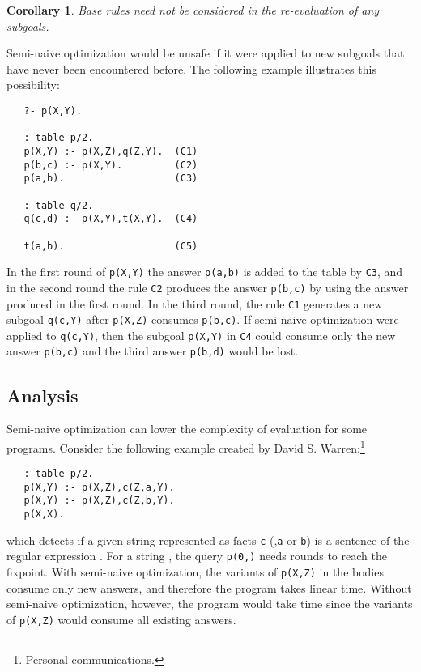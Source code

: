\documentclass{tlp}
\begin{document}
\newtheorem{corollary}{Corollary}
\begin{corollary}
Base rules need not be considered in the re-evaluation of any subgoals.
\end{corollary}

Semi-naive optimization would be unsafe if it were applied to new subgoals that have never been encountered before. The following example illustrates this possibility: 

\begin{verbatim}
   ?- p(X,Y).

   :-table p/2.
   p(X,Y) :- p(X,Z),q(Z,Y).  (C1)
   p(b,c) :- p(X,Y).         (C2)
   p(a,b).                   (C3)

   :-table q/2.
   q(c,d) :- p(X,Y),t(X,Y).  (C4)

   t(a,b).                   (C5)
\end{verbatim}

\noindent
In the first round of {\tt p(X,Y)} the answer {\tt p(a,b)} is added to the table by {\tt C3}, and in the second round the rule {\tt C2} produces the answer {\tt p(b,c)} by using the answer produced in the first round. In the third round, the rule  {\tt C1} generates a new subgoal {\tt q(c,Y)} after {\tt p(X,Z)} consumes {\tt p(b,c)}. If semi-naive optimization were applied to {\tt q(c,Y)}, then the subgoal {\tt p(X,Y)} in {\tt C4} could consume only the new answer {\tt p(b,c)} and the third answer {\tt p(b,d)} would be lost.

\subsection{\label{sec:analysis}Analysis}
Semi-naive optimization can lower the complexity of evaluation for some programs. Consider the following example created by David S. Warren:\footnote{Personal communications.}
\begin{verbatim}
   :-table p/2.
   p(X,Y) :- p(X,Z),c(Z,a,Y).
   p(X,Y) :- p(X,Z),c(Z,b,Y).
   p(X,X).
\end{verbatim}
which detects if a given string represented as facts {\tt c} (,{\tt a} or {\tt b})  is a sentence of the regular expression . For a string , the query {\tt p(0,)} needs  rounds to reach the fixpoint. With semi-naive optimization, the variants of {\tt p(X,Z)} in the bodies consume only new answers, and therefore the program takes linear time. Without semi-naive optimization, however, the program would take  time since the variants of {\tt p(X,Z)} would consume all existing answers.
\end{document}
